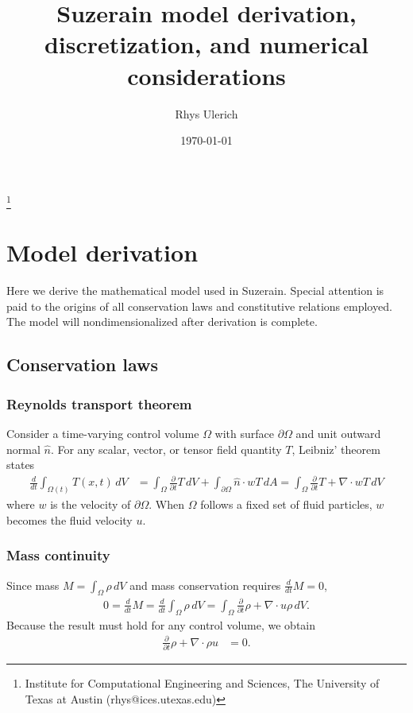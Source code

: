 \documentclass[letterpaper,11pt,nointlimits,reqno,draft]{amsart}
\begin{document}
\title{Suzerain model derivation,\\discretization, and numerical considerations}
\author{Rhys Ulerich}
\date{\today}
\thanks{Institute for Computational
    Engineering and Sciences, The University of Texas at Austin
    (rhys@ices.utexas.edu)}

\begin{abstract}
\end{abstract}

\maketitle
\renewcommand{\contentsname}{} %
\tableofcontents
\newpage

\section{Model derivation}
\label{sec:derivation}

Here we derive the mathematical model used in Suzerain.  Special attention is
paid to the origins of all conservation laws and constitutive relations
employed.  The model will nondimensionalized after derivation is complete.

\subsection{Conservation laws}

\subsubsection{Reynolds transport theorem}

Consider a time-varying control volume $\Omega$ with surface
$\partial\Omega$ and unit outward normal $\hat{n}$.  For any
scalar, vector, or tensor field quantity
$T$, Leibniz' theorem states
\begin{align}
  \label{eq:rtt}
  \frac{d}{dt}\int_{\Omega(t)}T(x,t)\,dV
  &=
  \int_{\Omega}\frac{\partial}{\partial{}t}T\,dV
  +
  \int_{\partial\Omega} \hat{n}\cdot{}w T\,dA
  =
  \int_{\Omega}\frac{\partial}{\partial{}t}T+\nabla\cdot{}wT\,dV
\end{align}
where $w$ is the velocity of $\partial\Omega$.  When $\Omega$ follows
a fixed set of fluid particles, $w$ becomes the fluid velocity $u$.

\subsubsection{Mass continuity}
Since mass $M=\int_{\Omega} \rho\,dV$
and mass conservation requires $\frac{d}{dt}M=0$,
\begin{align}
  0 = \frac{d}{dt}M
  = \frac{d}{dt}\int_{\Omega} \rho\,dV
  =
  \int_{\Omega}\frac{\partial}{\partial{}t}\rho+\nabla\cdot{}u\rho{}\,dV.
\end{align}
Because the result must hold for any control volume, we obtain
\begin{align}
  \label{eq:cons_mass}
  \frac{\partial}{\partial{}t}\rho+\nabla\cdot\rho{}u &= 0
  .
\end{align}
\end{document}
